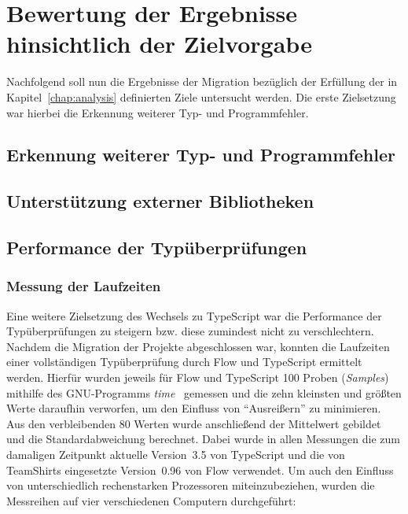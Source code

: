 \section{Bewertung der Ergebnisse hinsichtlich der Zielvorgabe}

Nachfolgend soll nun die Ergebnisse der Migration bezüglich der Erfüllung der in Kapitel~\ref{chap:analysis} definierten Ziele untersucht werden. Die erste Zielsetzung war hierbei die Erkennung weiterer Typ- und Programmfehler.

\subsection{Erkennung weiterer Typ- und Programmfehler}
\label{goal:new-type-errors}




\subsection{Unterstützung externer Bibliotheken}


\subsection{Performance der Typüberprüfungen}

\subsubsection{Messung der Laufzeiten}

Eine weitere Zielsetzung des Wechsels zu TypeScript war die Performance der Typüberprüfungen zu steigern bzw. diese zumindest nicht zu verschlechtern. Nachdem die Migration der Projekte abgeschlossen war, konnten die Laufzeiten einer vollständigen Typüberprüfung durch Flow und TypeScript ermittelt werden.
Hierfür wurden jeweils für Flow und TypeScript 100 Proben (\textit{Samples}) mithilfe des GNU-Programms \textit{time}~\autocite{GNU_TIME} gemessen und die zehn kleinsten und größten Werte daraufhin verworfen, um den Einfluss von \enquote{Ausreißern} zu minimieren. Aus den verbleibenden 80 Werten wurde anschließend der Mittelwert gebildet und die Standardabweichung berechnet. Dabei wurde in allen Messungen die zum damaligen Zeitpunkt aktuelle Version~3.5 von TypeScript und die von TeamShirts eingesetzte Version~0.96 von Flow verwendet. Um auch den Einfluss von unterschiedlich rechenstarken Prozessoren miteinzubeziehen, wurden die Messreihen auf vier verschiedenen Computern durchgeführt:

